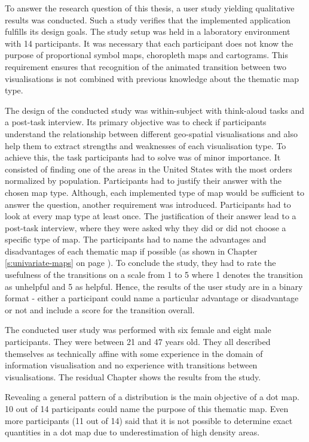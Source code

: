 To answer the research question of this thesis, a user study yielding qualitative results was conducted. Such a study verifies that the implemented application fulfills its design goals.
The study setup was held in a laboratory environment with 14 participants. It was necessary that each participant does not know the purpose of proportional symbol maps, choropleth maps and cartograms. This requirement ensures that recognition of the animated transition between two visualisations is not combined with previous knowledge about the thematic map type.

The design of the conducted study was within-subject with think-aloud tasks and a post-task interview. Its primary objective was to check if participants understand the relationship between different geo-spatial visualisations and also help them to extract strengths and weaknesses of each visualisation type. To achieve this, the task participants had to solve was of minor importance. It consisted of finding one of the areas in the United States with the most orders normalized by population. Participants had to justify their answer with the chosen map type. Although, each implemented type of map would be sufficient to answer the question, another requirement was introduced. Participants had to look at every map type at least once. The justification of their answer lead to a post-task interview, where they were asked why they did or did not choose a specific type of map. The participants had to name the advantages and disadvantages of each thematic map if possible (as shown in Chapter \ref{s:univariate-maps} on page \pageref{s:univariate-maps}).
To conclude the study, they had to rate the usefulness of the transitions on a scale from 1 to 5 where 1 denotes the transition as unhelpful and 5 as helpful. Hence, the results of the user study are in a binary format - either a participant could name a particular advantage or disadvantage or not and include a score for the transition overall.

The conducted user study was performed with six female and eight male participants. They were between 21 and 47 years old. They all described themselves as technically affine with some experience in the domain of information visualisation and no experience with transitions between visualisations. The residual Chapter shows the results from the study.

Revealing a general pattern of a distribution is the main objective of a dot map. 10 out of 14 participants could name the purpose of this thematic map. Even more participants (11 out of 14) said that it is not possible to determine exact quantities in a dot map due to underestimation of high density areas.

